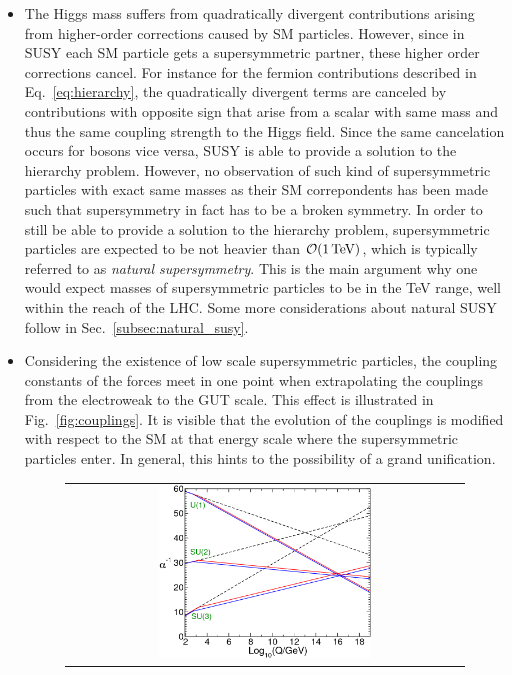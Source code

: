 \begin{itemize}
 \item The Higgs mass suffers from quadratically divergent contributions arising from higher-order corrections caused by SM particles. However, since in SUSY each SM particle gets a supersymmetric partner, these higher order corrections cancel. For instance for the fermion contributions described in Eq.~\ref{eq:hierarchy}, the quadratically divergent terms are canceled by contributions with opposite sign that arise from a scalar with same mass and thus the same coupling strength to the Higgs field. Since the same cancelation occurs for bosons vice versa, SUSY is able to provide a solution to the hierarchy problem. However, no observation of such kind of supersymmetric particles with exact same masses as their SM correpondents has been made such that supersymmetry in fact has to be a broken symmetry. In order to still be able to provide a solution to the hierarchy problem, supersymmetric particles are expected to be not heavier than $\mathcal{O}(\mathrm{1\,\text{Te}\kern-0.06667em\text{V}})$, which is typically referred to as \textit{natural supersymmetry}. This is the main argument why one would expect masses of supersymmetric particles to be in the TeV range, well within the reach of the LHC. Some more considerations about natural SUSY follow in Sec.~\ref{subsec:natural_susy}.
 \item Considering the existence of low scale supersymmetric particles, the coupling constants of the forces meet in one point when extrapolating the couplings from the electroweak to the GUT scale. This effect is illustrated in Fig.~\ref{fig:couplings}. It is visible that the evolution of the couplings is modified with respect to the SM at that energy scale where the supersymmetric particles enter. In general, this hints to the possibility of a grand unification.
\begin{figure}[!t]
  \centering
  \begin{tabular}{c}
    \includegraphics[width=0.55\textwidth]{figures/unification.png}

\end{tabular}
\end{figure}
\end{itemize}
